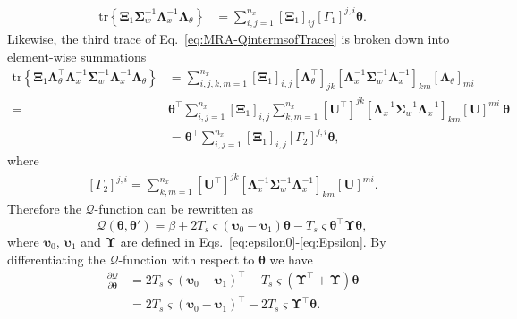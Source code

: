 \documentclass[review,authoryear,3p]{elsarticle}
\begin{document}
\begin{align}
\mathrm{tr} \left\lbrace \boldsymbol \Xi_1\boldsymbol\Sigma_w^{-1}\boldsymbol\Lambda_x^{-1}\boldsymbol\Lambda_{\theta}\right\rbrace&=
\sum_{i,j=1}^{n_x}\left[ \boldsymbol\Xi_1\right]_{ij}\left[ \Gamma_1\right] ^{j,i}\boldsymbol\theta.
\end{align}
Likewise, the third trace of Eq.~\eqref{eq:MRA-QintermsofTraces} is broken down into element-wise summations
\begin{align}
\mathrm{tr} \left\lbrace \boldsymbol\Xi_1 \boldsymbol\Lambda_{\theta}^\top\boldsymbol\Lambda_x^{-1}\boldsymbol\Sigma_w^{-1}\boldsymbol\Lambda_x^{-1}\boldsymbol\Lambda_{\theta}\right\rbrace&=\sum_{i,j,k,m=1}^{n_x}\left[\boldsymbol\Xi_1\right] _{i,j}[\boldsymbol\Lambda_{\theta}^{\top}]_{jk} \left[\boldsymbol\Lambda_x^{-1}\boldsymbol\Sigma_w^{-1}\boldsymbol\Lambda_x^{-1} \right]_{km}[\boldsymbol\Lambda_{\theta}]_{mi} \nonumber \\
=&\boldsymbol\theta^\top\sum_{i,j=1}^{n_x}\left[\boldsymbol\Xi_1\right] _{i,j}\sum_{k,m=1}^{n_x}[\mathbf U^{\top}]^{jk} \left[\boldsymbol\Lambda_x^{-1}\boldsymbol\Sigma_w^{-1}\boldsymbol\Lambda_x^{-1} \right]_{km}[\mathbf U]^{mi}~\boldsymbol\theta \nonumber \\
&=\boldsymbol\theta^\top\sum_{i,j=1}^{n_x}\left[\boldsymbol\Xi_1\right] _{i,j}\left[ \Gamma_2\right] ^{j,i}\boldsymbol\theta,
\end{align}
where
\begin{align}
\left[ \Gamma_2\right] ^{j,i}=\sum_{k,m=1}^{n_x}[\mathbf U^{\top}]^{jk} \left[\boldsymbol\Lambda_x^{-1}\boldsymbol\Sigma_w^{-1}\boldsymbol\Lambda_x^{-1} \right]_{km}[\mathbf U]^{mi}.
\end{align}
Therefore the $\mathcal Q$-function can be rewritten as
\begin{equation}\label{eq:appQCompact}
\mathcal Q\left(\boldsymbol \theta,\boldsymbol\theta'\right)=\beta+2T_s\varsigma\left(\boldsymbol\upsilon_0-\boldsymbol\upsilon_1\right)\boldsymbol\theta-T_s\varsigma\boldsymbol\theta^\top\boldsymbol\Upsilon\boldsymbol\theta,
\end{equation}
where 
$\boldsymbol\upsilon_0$, $\boldsymbol\upsilon_1$ and $\boldsymbol\Upsilon$ are defined in Eqs.~\eqref{eq:epsilon0}-\eqref{eq:Epsilon}. By differentiating the $\mathcal Q$-function with respect to $\boldsymbol\theta$ we have
\begin{align}\label{eq:MRA-QDerivative}
\frac{\partial \mathcal Q}{\partial \boldsymbol\theta}&=2T_s\varsigma(\boldsymbol\upsilon_0-\boldsymbol\upsilon_1)^\top-T_s\varsigma(\boldsymbol\Upsilon^\top+\boldsymbol\Upsilon)\boldsymbol\theta \nonumber \\
&=2T_s\varsigma(\boldsymbol\upsilon_0-\boldsymbol\upsilon_1)^\top-2T_s\varsigma\boldsymbol\Upsilon^\top\boldsymbol\theta.
\end{align}
\end{document}
